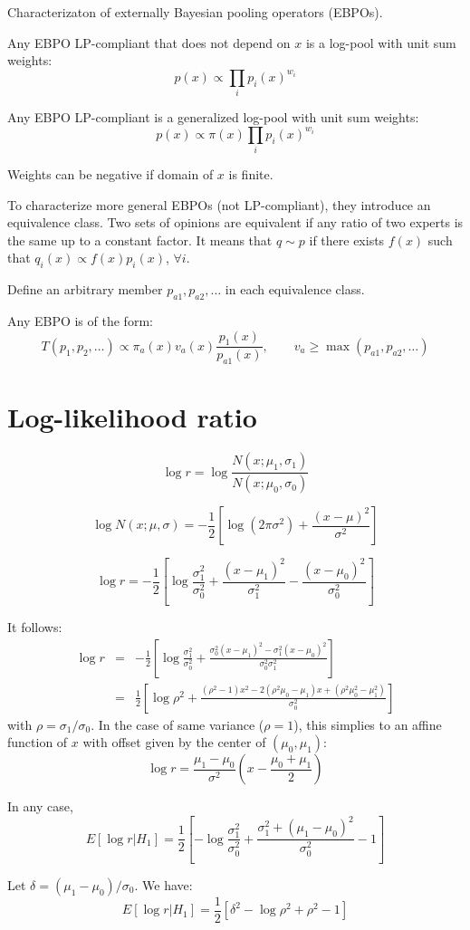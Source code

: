 \documentclass[english]{scrartcl}
\begin{document}
Characterizaton of externally Bayesian pooling operators (EBPOs).

Any EBPO LP-compliant that does not depend on $x$ is a log-pool with unit sum weights:
$$
p(x) \propto \prod_i p_i(x)^{w_i}
$$

Any EBPO LP-compliant is a generalized log-pool with unit sum weights:
$$
p(x) \propto \pi(x) \prod_i p_i(x)^{w_i}
$$

Weights can be negative if domain of $x$ is finite. 

To characterize more general EBPOs (not LP-compliant), they introduce an equivalence class. Two sets of opinions are equivalent if any ratio of two experts is the same up to a constant factor. It means that $q\sim p$ if there exists $f(x)$ such that  
$q_i(x) \propto f(x) p_i(x)$, $\forall i$.

Define an arbitrary member $p_{a1},p_{a2},\ldots$ in each equivalence class.

Any EBPO is of the form:
$$
T(p_1,p_2,\ldots) \propto \pi_a(x) v_a(x) \frac{p_1(x)}{p_{a1}(x)},
\qquad
v_a \geq \max (p_{a1},p_{a2},\ldots)
$$





\section{Log-likelihood ratio}

$$
\log r = \log \frac{N(x;\mu_1,\sigma_1)}{N(x;\mu_0,\sigma_0)}
$$

$$
\log N(x;\mu,\sigma) = -\frac{1}{2}\left[
\log(2\pi\sigma^2) + \frac{(x-\mu)^2}{\sigma^2}
\right]
$$

$$
\log r = -\frac{1}{2}
\left[
\log \frac{\sigma_1^2}{\sigma_0^2}
+ \frac{(x-\mu_1)^2}{\sigma_1^2} - \frac{(x-\mu_0)^2}{\sigma_0^2}
\right]
$$

It follows:
\begin{eqnarray*}
\log r 
 & = & 
-\frac{1}{2}\left[
\log \frac{\sigma_1^2}{\sigma_0^2}
+ \frac{\sigma_0^2(x-\mu_1)^2 - \sigma_1^2(x-\mu_0)^2}{\sigma_0^2 \sigma_1^2}
\right] \\
 & = & 
\frac{1}{2}\left[
\log \rho^2
+ \frac{(\rho^2-1)x^2 - 2(\rho^2\mu_0-\mu_1)x+ (\rho^2\mu_0 ^2-\mu_1^2)}{\sigma_0^2}
\right]
\end{eqnarray*}
with $\rho=\sigma_1/\sigma_0$. In the case of same variance ($\rho=1$), this simplies to an affine function of $x$ with offset given by the center of $(\mu_0,\mu_1)$:
$$
\log r = \frac{\mu_1-\mu_0}{\sigma^2} \left(
x - \frac{\mu_0 + \mu_1}{2}
\right) 
$$

In any case,
$$
E[\log r | H_1] = 
\frac{1}{2}
\left[
- \log \frac{\sigma_1^2}{\sigma_0^2}
+ \frac{\sigma_1^2 + (\mu_1-\mu_0)^2}{\sigma_0^2}
- 1
\right]
$$

Let $\delta = (\mu_1-\mu_0)/\sigma_0$. We have:
$$
E[\log r | H_1] = 
\frac{1}{2}
\left[
\delta^2
- \log \rho^2
+ \rho^2  - 1
\right]
$$







\end{document}
